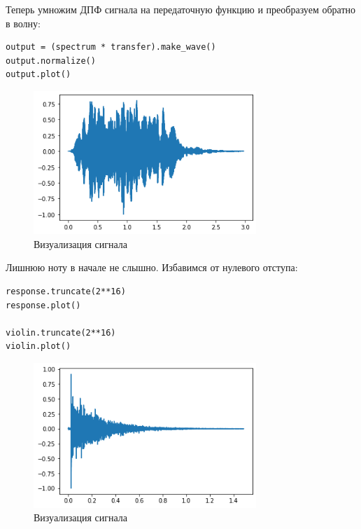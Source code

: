 \documentclass[a4paper,12pt]{report}
\begin{document}
Теперь умножим ДПФ сигнала на передаточную функцию и преобразуем обратно в волну:

\begin{lstlisting}[caption=Совмещение сигнала]
output = (spectrum * transfer).make_wave()
output.normalize()
output.plot()
\end{lstlisting}

\begin{figure}[H]
        \centering
        \includegraphics[width=0.75\textwidth]{4.png}
        \caption{Визуализация сигнала}
        \label{4}
\end{figure}

Лишнюю ноту в начале не слышно. Избавимся от нулевого отступа:

\begin{lstlisting}[caption=Избавление от нулевого отступа]
response.truncate(2**16)
response.plot()

violin.truncate(2**16)
violin.plot()
\end{lstlisting}

\begin{figure}[H]
        \centering
        \includegraphics[width=0.75\textwidth]{5.png}
        \caption{Визуализация сигнала}
        \label{5}
\end{figure}
\end{document}
